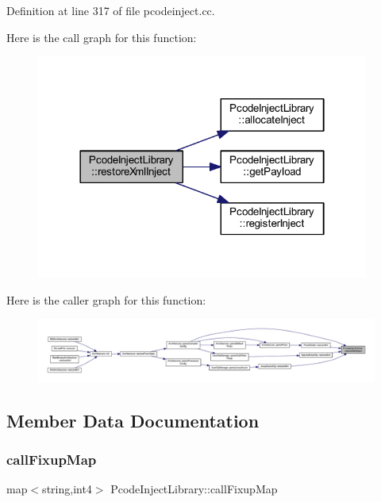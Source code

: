 Definition at line 317 of file pcodeinject.\+cc.

Here is the call graph for this function\+:
\nopagebreak
\begin{figure}[H]
\begin{center}
\leavevmode
\includegraphics[width=310pt]{class_pcode_inject_library_a738666065a924346cf552b1d62c84848_cgraph}
\end{center}
\end{figure}
Here is the caller graph for this function\+:
\nopagebreak
\begin{figure}[H]
\begin{center}
\leavevmode
\includegraphics[width=350pt]{class_pcode_inject_library_a738666065a924346cf552b1d62c84848_icgraph}
\end{center}
\end{figure}


\subsection{Member Data Documentation}
\mbox{\label{class_pcode_inject_library_a8ee8b14330c4a1a686bcecd84dc0c2e9}} 
\subsubsection{\texorpdfstring{callFixupMap}{callFixupMap}}
{\footnotesize\ttfamily map$<$string,int4$>$ Pcode\+Inject\+Library\+::call\+Fixup\+Map\hspace{0.3cm}{\ttfamily [protected]}}



